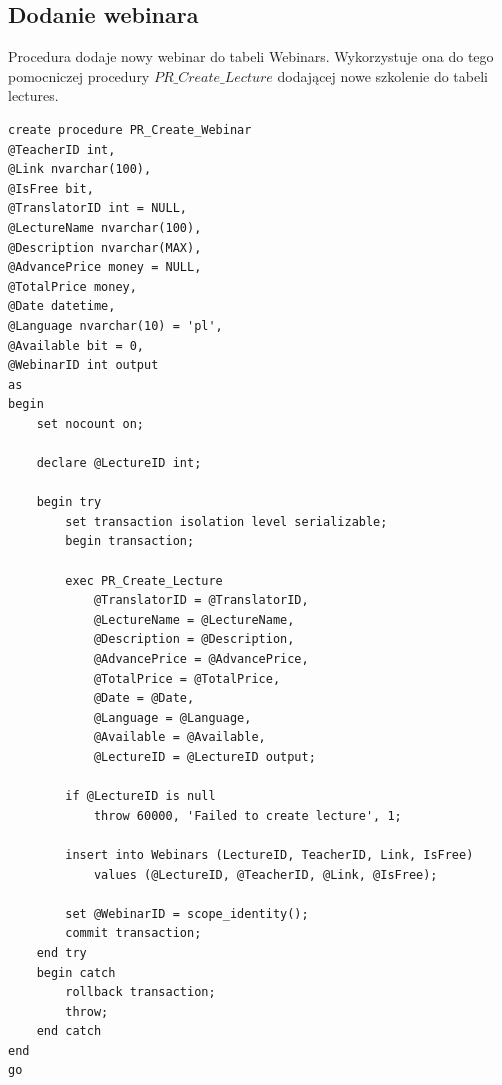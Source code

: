 \documentclass[11pt,a4paper]{article}
\begin{document}
\subsection{Dodanie webinara}
Procedura dodaje nowy webinar do tabeli Webinars. Wykorzystuje ona do tego pomocniczej procedury $PR\_Create\_Lecture$ dodającej nowe szkolenie do tabeli lectures.
\begin{Verbatim}[breaklines=true]
create procedure PR_Create_Webinar
@TeacherID int,
@Link nvarchar(100),
@IsFree bit,
@TranslatorID int = NULL,
@LectureName nvarchar(100),
@Description nvarchar(MAX),
@AdvancePrice money = NULL,
@TotalPrice money,
@Date datetime,
@Language nvarchar(10) = 'pl',
@Available bit = 0,
@WebinarID int output
as
begin
    set nocount on;

    declare @LectureID int;

    begin try
        set transaction isolation level serializable;
        begin transaction;

        exec PR_Create_Lecture
            @TranslatorID = @TranslatorID,
            @LectureName = @LectureName,
            @Description = @Description,
            @AdvancePrice = @AdvancePrice,
            @TotalPrice = @TotalPrice,
            @Date = @Date,
            @Language = @Language,
            @Available = @Available,
            @LectureID = @LectureID output;

        if @LectureID is null
            throw 60000, 'Failed to create lecture', 1;

        insert into Webinars (LectureID, TeacherID, Link, IsFree)
            values (@LectureID, @TeacherID, @Link, @IsFree);

        set @WebinarID = scope_identity();
        commit transaction;
    end try
    begin catch
        rollback transaction;
        throw;
    end catch
end
go
\end{Verbatim}
\end{document}

